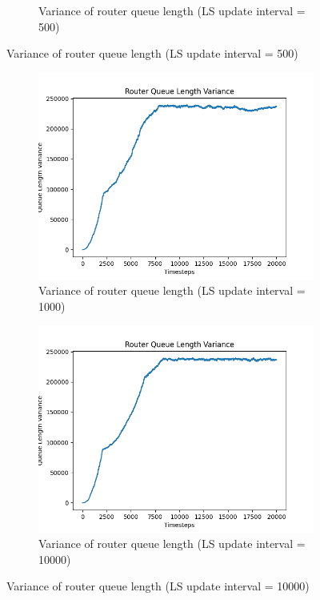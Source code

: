 \begin{appendices}
\begin{figure}[H]
\begin{subfigure}[b]{0.475\textwidth}
            \caption[]{Variance of router queue length (LS update interval = 500)}
            \label{fig:qvar-500}
        \end{subfigure}
    \end{figure}
    \begin{figure}[H]\ContinuedFloat
        \begin{subfigure}{0.475\textwidth}
            \includegraphics[width=\textwidth]{figs/appendix/variance_ls=1000.png}
            \caption[]{Variance of router queue length (LS update interval = 1000)}
            \label{fig:qvar-1000}
        \end{subfigure}
        \hfill
        \begin{subfigure}[H]{0.475\textwidth}
            \includegraphics[width=\textwidth]{figs/appendix/variance_ls=10000.png}
            \caption[]{Variance of router queue length (LS update interval = 10000)}
            \label{fig:qvar-10000}
        \end{subfigure}
    \end{figure}
\end{appendices}
